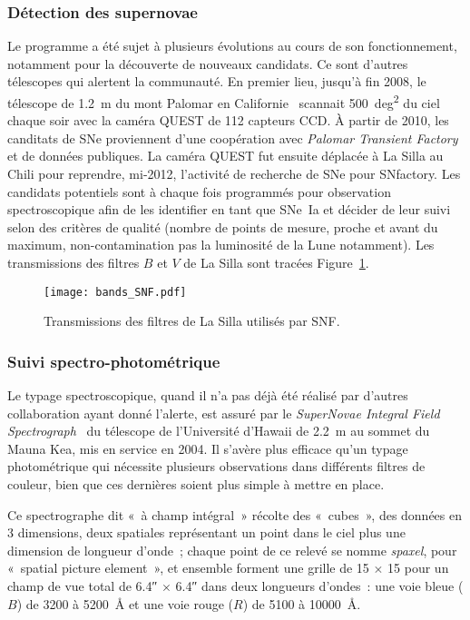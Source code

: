 \documentclass[../main/main.tex]{subfiles}
\begin{document}
\subsubsection{Détection des supernovae}\label{sssec:snfdetec}

Le programme a été sujet à plusieurs évolutions au cours de son fonctionnement,
notamment pour la découverte de nouveaux candidats. Ce sont d'autres télescopes
qui alertent la communauté. En premier lieu, jusqu'à fin 2008, le télescope de
\SI{1.2}{m} du mont Palomar en Californie~\citep{rabinowitz2003} scannait
\SI{500}{deg^2} du ciel chaque soir avec la caméra QUEST de 112 capteurs CCD. À
partir de 2010, les canditats de SNe proviennent d'une coopération avec
\textit{Palomar Transient Factory}~\citep[PTF,][]{law2009} et de données
publiques. La caméra QUEST fut ensuite déplacée à La Silla au Chili
\citep[LSQ,][]{hadjiyska2012} pour reprendre, mi-2012, l'activité de recherche
de SNe pour SNfactory. Les candidats potentiels sont à chaque fois programmés
pour observation spectroscopique afin de les identifier en tant que SNe~Ia et
décider de leur suivi selon des critères de qualité (nombre de points de mesure,
proche et avant du maximum, non-contamination pas la luminosité de la Lune
notamment). Les transmissions des filtres $B$ et $V$ de La Silla sont tracées
Figure~\ref{fig:snfbands}.

\begin{figure}[h]
    \centering
    \texttt{[image: bands\_SNF.pdf]}
    \captionsetup{justification=centering}
    \caption{Transmissions des filtres de La Silla utilisés par SNF.}
    \label{fig:snfbands}
\end{figure}

\subsubsection{Suivi spectro-photométrique}\label{sssec:snfspectro}

Le typage spectroscopique, quand il n'a pas déjà été réalisé par d'autres
collaboration ayant donné l'alerte, est assuré par le \textit{SuperNovae
Integral Field Spectrograph}~\citep[SNIFS,][]{lantz2004} du télescope de
l'Université d'Hawaii de \SI{2.2}{m} au sommet du Mauna Kea, mis en service en
2004. Il s'avère plus efficace qu'un typage photométrique qui nécessite
plusieurs observations dans différents filtres de couleur, bien que ces
dernières soient plus simple à mettre en place.

Ce spectrographe dit «~à champ intégral~» récolte des «~cubes~», des données en
3 dimensions, deux spatiales représentant un point dans le ciel plus une
dimension de longueur d'onde~; chaque point de ce relevé se nomme
\textit{spaxel}, pour «~spatial picture element~», et ensemble forment une
grille de 15 $\times$ 15 pour un champ de vue total de \ang{;;6.4} $\times$
\ang{;;6.4} dans deux longueurs d'ondes~: une voie bleue ($B$) de 3200 à
\SI{5200}{\angstrom} et une voie rouge ($R$) de 5100 à \SI{10000}{\angstrom}.
\end{document}
